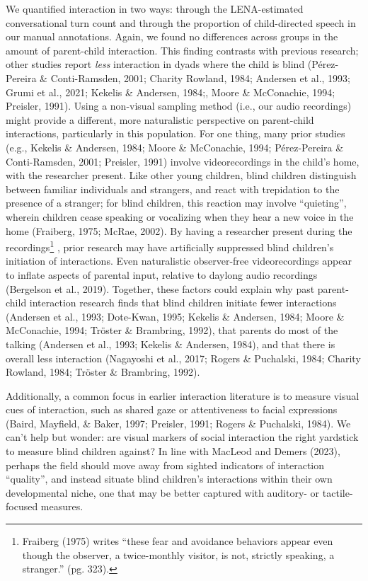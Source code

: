 \documentclass[
  man]{apa6}
\begin{document}
We quantified interaction in two ways: through the LENA-estimated conversational turn count and through the proportion of child-directed speech in our manual annotations. Again, we found no differences across groups in the amount of parent-child interaction. This finding contrasts with previous research; other studies report \emph{less} interaction in dyads where the child is blind (Pérez-Pereira \& Conti-Ramsden, 2001; Charity Rowland, 1984; Andersen et al., 1993; Grumi et al., 2021; Kekelis \& Andersen, 1984;, Moore \& McConachie, 1994; Preisler, 1991). Using a non-visual sampling method (i.e., our audio recordings) might provide a different, more naturalistic perspective on parent-child interactions, particularly in this population. For one thing, many prior studies (e.g., Kekelis \& Andersen, 1984; Moore \& McConachie, 1994; Pérez-Pereira \& Conti-Ramsden, 2001; Preisler, 1991) involve videorecordings in the child's home, with the researcher present. Like other young children, blind children distinguish between familiar individuals and strangers, and react with trepidation to the presence of a stranger; for blind children, this reaction may involve ``quieting'', wherein children cease speaking or vocalizing when they hear a new voice in the home (Fraiberg, 1975; McRae, 2002). By having a researcher present during the recordings\footnote{Fraiberg (1975) writes ``these fear and avoidance behaviors appear even though the observer, a twice-monthly visitor, is not, strictly speaking, a stranger.'' (pg. 323).} , prior research may have artificially suppressed blind children's initiation of interactions. Even naturalistic observer-free videorecordings appear to inflate aspects of parental input, relative to daylong audio recordings (Bergelson et al., 2019). Together, these factors could explain why past parent-child interaction research finds that blind children initiate fewer interactions (Andersen et al., 1993; Dote-Kwan, 1995; Kekelis \& Andersen, 1984; Moore \& McConachie, 1994; Tröster \& Brambring, 1992), that parents do most of the talking (Andersen et al., 1993; Kekelis \& Andersen, 1984), and that there is overall less interaction (Nagayoshi et al., 2017; Rogers \& Puchalski, 1984; Charity Rowland, 1984; Tröster \& Brambring, 1992).

Additionally, a common focus in earlier interaction literature is to measure visual cues of interaction, such as shared gaze or attentiveness to facial expressions (Baird, Mayfield, \& Baker, 1997; Preisler, 1991; Rogers \& Puchalski, 1984). We can't help but wonder: are visual markers of social interaction the right yardstick to measure blind children against? In line with MacLeod and Demers (2023), perhaps the field should move away from sighted indicators of interaction ``quality'', and instead situate blind children's interactions within their own developmental niche, one that may be better captured with auditory- or tactile-focused measures.
\end{document}
